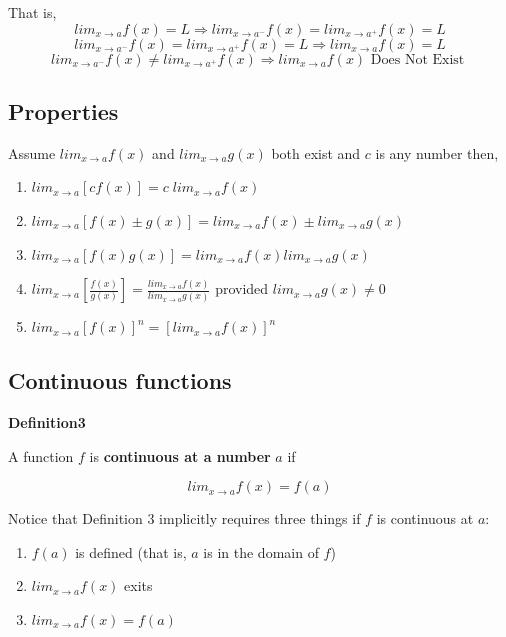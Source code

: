 \documentclass[]{book}
\providecommand{\tightlist}{%
  \setlength{\itemsep}{0pt}\setlength{\parskip}{0pt}}
\begin{document}
That is,
\[lim_{x\to a}f(x)=L \Rightarrow  lim_{x\to a^-}f(x)= lim_{x\to a^+}f(x)=L\]
\[lim_{x\to a^-}f(x)= lim_{x\to a^+}f(x)=L \Rightarrow lim_{x\to a}f(x)=L\]
\[lim_{x\to a^-}f(x) \ne lim_{x\to a^+}f(x) \Rightarrow lim_{x\to a}f(x) \text{ Does Not Exist }\]

\hypertarget{properties}{%
\subsection*{Properties}\label{properties}}

Assume \(lim_{x\to a}f(x)\) and \(lim_{x\to a}g(x)\) both exist and \(c\) is any number then,

\begin{enumerate}
\def\labelenumi{\arabic{enumi}.}
\item
  \(lim_{x\to a}[cf(x)] = c\;lim_{x\to a}f(x)\)
\item
  \(lim_{x\to a}[f(x) \pm g(x)] = lim_{x\to a}f(x) \pm lim_{x\to a}g(x)\)
\item
  \(lim_{x\to a}[f(x)g(x)] = lim_{x\to a}f(x) lim_{x\to a}g(x)\)
\item
  \(lim_{x\to a}\left[\frac{f(x)}{g(x)}\right] = \frac{lim_{x\to a}f(x)}{lim_{x\to a}g(x)}\) provided \(lim_{x\to a}g(x) \ne 0\)
\item
  \(lim_{x\to a}[f(x)]^n = [lim_{x\to a}f(x)]^n\)
\end{enumerate}

\hypertarget{continuous-functions}{%
\subsection*{Continuous functions}\label{continuous-functions}}

\textbf{Definition3}

A function \(f\) is \textbf{continuous at a number} \(a\) if

\[lim_{x\to a}f(x)=f(a)\]

Notice that Definition 3 implicitly requires three things if \(f\) is continuous at \(a\):

\begin{enumerate}
\def\labelenumi{\arabic{enumi}.}
\tightlist
\item
  \(f(a)\) is defined (that is, \(a\) is in the domain of \(f\))
\item
  \(lim_{x\to a}f(x)\) exits
\item
  \(lim_{x\to a}f(x) = f(a)\)
\end{enumerate}
\end{document}
